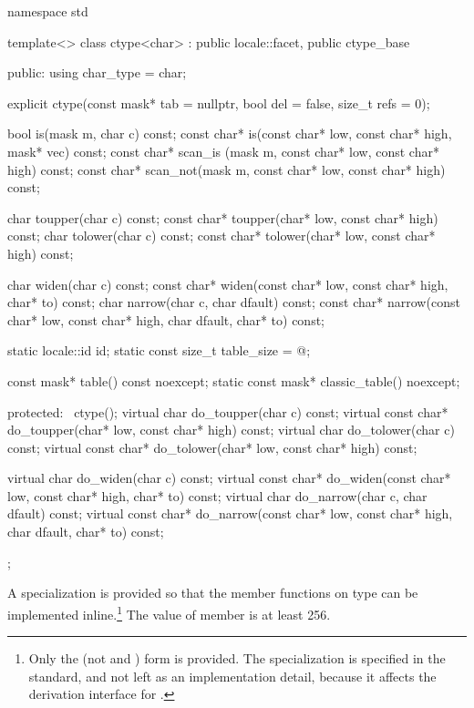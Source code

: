 %
\begin{codeblock}
namespace std {
  template<>
    class ctype<char> : public locale::facet, public ctype_base {
    public:
      using char_type = char;

      explicit ctype(const mask* tab = nullptr, bool del = false, size_t refs = 0);

      bool is(mask m, char c) const;
      const char* is(const char* low, const char* high, mask* vec) const;
      const char* scan_is (mask m, const char* low, const char* high) const;
      const char* scan_not(mask m, const char* low, const char* high) const;

      char        toupper(char c) const;
      const char* toupper(char* low, const char* high) const;
      char        tolower(char c) const;
      const char* tolower(char* low, const char* high) const;

      char  widen(char c) const;
      const char* widen(const char* low, const char* high, char* to) const;
      char  narrow(char c, char dfault) const;
      const char* narrow(const char* low, const char* high, char dfault, char* to) const;

      static locale::id id;
      static const size_t table_size = @\impdef@;

      const mask* table() const noexcept;
      static const mask* classic_table() noexcept;

    protected:
      ~ctype();
      virtual char        do_toupper(char c) const;
      virtual const char* do_toupper(char* low, const char* high) const;
      virtual char        do_tolower(char c) const;
      virtual const char* do_tolower(char* low, const char* high) const;

      virtual char        do_widen(char c) const;
      virtual const char* do_widen(const char* low, const char* high, char* to) const;
      virtual char        do_narrow(char c, char dfault) const;
      virtual const char* do_narrow(const char* low, const char* high,
                                    char dfault, char* to) const;
    };
}
\end{codeblock}

\pnum
A specialization
is provided so that the member functions on type
can be implemented
inline.\footnote{Only the
(not
and
)
form is provided.
The specialization is specified in the standard, and not left as an
implementation detail, because it affects the derivation interface for
.}
The  value of member
is at least 256.

